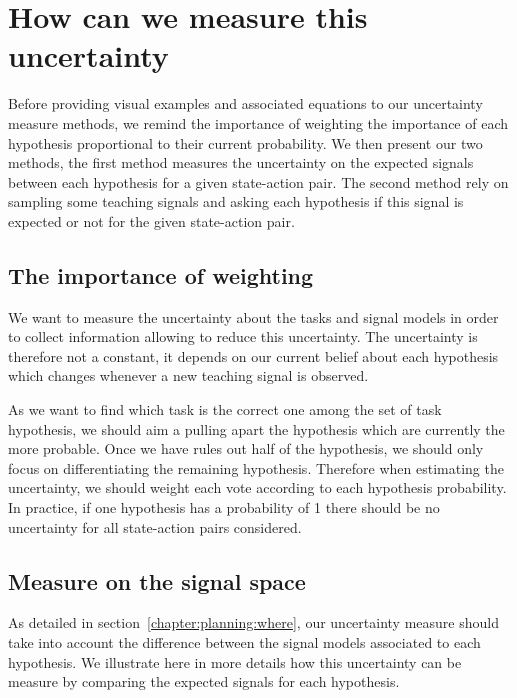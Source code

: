 \section{How can we measure this uncertainty}
\label{chapter:planning:how}

Before providing visual examples and associated equations to our uncertainty measure methods, we remind the importance of weighting the importance of each hypothesis proportional to their current probability. We then present our two methods, the first method measures the uncertainty on the expected signals between each hypothesis for a given state-action pair. The second method rely on sampling some teaching signals and asking each hypothesis if this signal is expected or not for the given state-action pair.

\subsection{The importance of weighting}

We want to measure the uncertainty about the tasks and signal models in order to collect information allowing to reduce this uncertainty. The uncertainty is therefore not a constant, it depends on our current belief about each hypothesis which changes whenever a new teaching signal is observed.

As we want to find which task is the correct one among the set of task hypothesis, we should aim a pulling apart the hypothesis which are currently the more probable. Once we have rules out half of the hypothesis, we should only focus on differentiating the remaining hypothesis. Therefore when estimating the uncertainty, we should weight each vote according to each hypothesis probability. In practice, if one hypothesis has a probability of 1 there should be no uncertainty for all state-action pairs considered.

\subsection{Measure on the signal space}
\label{chapter:planning:uncertaintysignalspace}

As detailed in section~\ref{chapter:planning:where}, our uncertainty measure should take into account the difference between the signal models associated to each hypothesis. We illustrate here in more details how this uncertainty can be measure by comparing the expected signals for each hypothesis.

